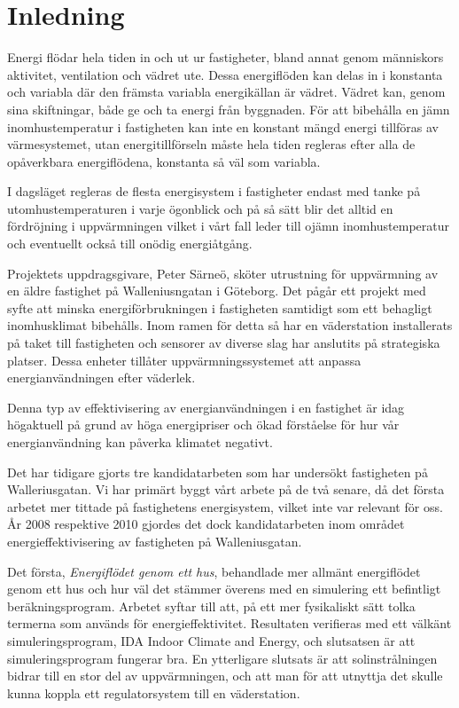 \chapter{Inledning}

Energi flödar hela tiden in och ut ur fastigheter, bland annat genom människors aktivitet, ventilation och vädret ute. Dessa energiflöden kan delas in i konstanta och variabla där den främsta variabla energikällan är vädret. Vädret kan, genom sina skiftningar, både ge och ta energi från byggnaden. För att bibehålla en jämn inomhustemperatur i fastigheten kan inte en konstant mängd energi tillföras av värmesystemet, utan energitillförseln måste hela tiden regleras efter alla de opåverkbara energiflödena, konstanta så väl som variabla.

I dagsläget regleras de flesta energisystem i fastigheter endast med tanke på utomhustemperaturen i varje ögonblick och på så sätt blir det alltid en fördröjning i uppvärmningen vilket i vårt fall leder till ojämn inomhustemperatur och eventuellt också till onödig energiåtgång.

Projektets uppdragsgivare, Peter Särneö, sköter utrustning för uppvärmning av en äldre fastighet på Walleniusngatan i Göteborg. Det pågår ett projekt med syfte att minska energiförbrukningen i fastigheten samtidigt som ett behagligt inomhusklimat bibehålls. Inom ramen för detta så har en väderstation installerats på taket till fastigheten och sensorer av diverse slag har anslutits på strategiska platser.
 Dessa enheter tillåter uppvärmningssystemet att anpassa energianvändningen efter väderlek. %

Denna typ av effektivisering av energianvändningen i en fastighet är idag högaktuell på grund av höga energipriser och ökad förståelse för hur vår energianvändning kan påverka klimatet negativt.

Det har tidigare gjorts tre kandidatarbeten som har undersökt fastigheten på Walleriusgatan. Vi har primärt byggt vårt arbete på de två senare, då det första arbetet mer tittade på fastighetens energisystem, vilket inte var relevant för oss. År 2008 respektive 2010 gjordes det dock kandidatarbeten inom området energieffektivisering av fastigheten på Walleniusgatan. 

Det första, \textit{Energiflödet genom ett hus}\cite{kandidatarbete2008}, behandlade mer allmänt energiflödet genom ett hus och hur väl det stämmer överens med en simulering ett befintligt beräkningsprogram. Arbetet syftar till att, på ett mer fysikaliskt sätt tolka termerna som används för energieffektivitet. Resultaten verifieras med ett välkänt simuleringsprogram, IDA Indoor Climate and Energy, och slutsatsen är att simuleringsprogram fungerar bra. En ytterligare slutsats är att solinstrålningen bidrar till en stor del av uppvärmningen, och att man för att utnyttja det skulle kunna koppla ett regulatorsystem till en väderstation.

